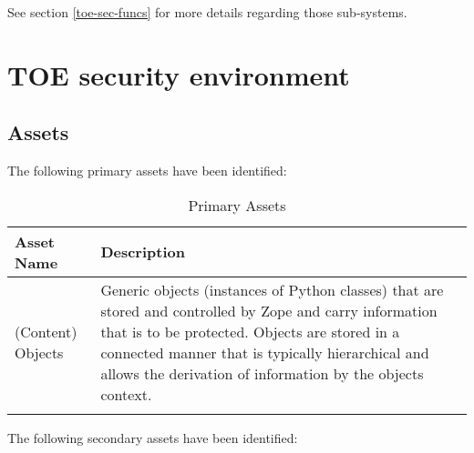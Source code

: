 \documentclass[12pt,english]{scrbook}
\begin{document}
See section \vref{toe-sec-funcs} for more details regarding those sub-systems.




\chapter{TOE security environment}





\section{Assets}

The following primary assets have been identified:

\begin{longtable}[c]{lp{10cm}}
  \toprule 
  Asset Name & Description \\
  \midrule\endhead

  (Content) Objects & 
  Generic objects (instances of Python classes) that
  are stored and controlled by Zope and carry
  information that is to be protected. Objects are
  stored in a connected manner that is typically
  hierarchical and allows the derivation of
  information by the objects context. \\
  \bottomrule
  \caption{Primary Assets}
  \label{tab-assets}
\end{longtable}

The following secondary assets have been identified:
\end{document}
